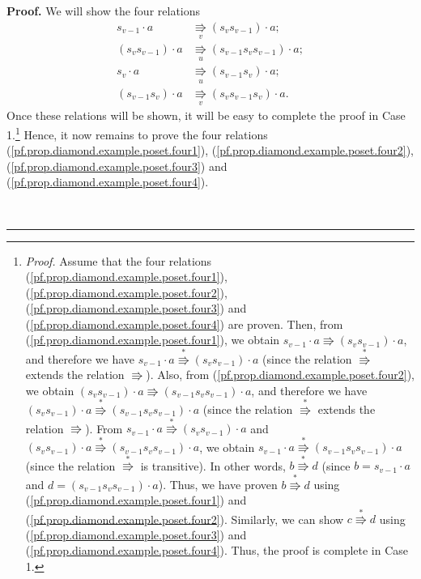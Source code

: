 \documentclass[numbers=enddot,12pt,final,onecolumn,notitlepage]{scrartcl}%
\theoremstyle{definition}
\newenvironment{proof}[1][Proof]{\noindent\textbf{#1.} }{\ \rule{0.5em}{0.5em}}
\begin{document}
\begin{proof}
We will show the four relations%
\begin{align}
s_{v-1}\cdot a  &  \underset{v}{\Rrightarrow}\left(  s_{v}s_{v-1}\right)
\cdot a;\label{pf.prop.diamond.example.poset.four1}\\
\left(  s_{v}s_{v-1}\right)  \cdot a  &  \underset{u}{\Rrightarrow}\left(
s_{v-1}s_{v}s_{v-1}\right)  \cdot
a;\label{pf.prop.diamond.example.poset.four2}\\
s_{v}\cdot a  &  \underset{u}{\Rrightarrow}\left(  s_{v-1}s_{v}\right)  \cdot
a;\label{pf.prop.diamond.example.poset.four3}\\
\left(  s_{v-1}s_{v}\right)  \cdot a  &  \underset{v}{\Rrightarrow}\left(
s_{v}s_{v-1}s_{v}\right)  \cdot a. \label{pf.prop.diamond.example.poset.four4}%
\end{align}
Once these relations will be shown, it will be easy to complete the proof in
Case 1.\footnote{\textit{Proof.} Assume that the four relations
(\ref{pf.prop.diamond.example.poset.four1}),
(\ref{pf.prop.diamond.example.poset.four2}),
(\ref{pf.prop.diamond.example.poset.four3}) and
(\ref{pf.prop.diamond.example.poset.four4}) are proven. Then, from
(\ref{pf.prop.diamond.example.poset.four1}), we obtain $s_{v-1}\cdot
a\Rrightarrow\left(  s_{v}s_{v-1}\right)  \cdot a$, and therefore we have
$s_{v-1}\cdot a\overset{\ast}{\Rrightarrow}\left(  s_{v}s_{v-1}\right)  \cdot
a$ (since the relation $\overset{\ast}{\Rrightarrow}$ extends the relation
$\Rrightarrow$). Also, from (\ref{pf.prop.diamond.example.poset.four2}), we
obtain $\left(  s_{v}s_{v-1}\right)  \cdot a\Rrightarrow\left(  s_{v-1}%
s_{v}s_{v-1}\right)  \cdot a$, and therefore we have $\left(  s_{v}%
s_{v-1}\right)  \cdot a\overset{\ast}{\Rrightarrow}\left(  s_{v-1}s_{v}%
s_{v-1}\right)  \cdot a$ (since the relation $\overset{\ast}{\Rrightarrow}$
extends the relation $\Rrightarrow$). From $s_{v-1}\cdot a\overset{\ast
}{\Rrightarrow}\left(  s_{v}s_{v-1}\right)  \cdot a$ and $\left(  s_{v}%
s_{v-1}\right)  \cdot a\overset{\ast}{\Rrightarrow}\left(  s_{v-1}s_{v}%
s_{v-1}\right)  \cdot a$, we obtain $s_{v-1}\cdot a\overset{\ast
}{\Rrightarrow}\left(  s_{v-1}s_{v}s_{v-1}\right)  \cdot a$ (since the
relation $\overset{\ast}{\Rrightarrow}$ is transitive). In other words,
$b\overset{\ast}{\Rrightarrow}d$ (since $b=s_{v-1}\cdot a$ and $d=\left(
s_{v-1}s_{v}s_{v-1}\right)  \cdot a$). Thus, we have proven $b\overset{\ast
}{\Rrightarrow}d$ using (\ref{pf.prop.diamond.example.poset.four1}) and
(\ref{pf.prop.diamond.example.poset.four2}). Similarly, we can show
$c\overset{\ast}{\Rrightarrow}d$ using
(\ref{pf.prop.diamond.example.poset.four3}) and
(\ref{pf.prop.diamond.example.poset.four4}). Thus, the proof is complete in
Case 1.} Hence, it now remains to prove the four relations
(\ref{pf.prop.diamond.example.poset.four1}),
(\ref{pf.prop.diamond.example.poset.four2}),
(\ref{pf.prop.diamond.example.poset.four3}) and
(\ref{pf.prop.diamond.example.poset.four4}).


\end{proof}
\end{document}
